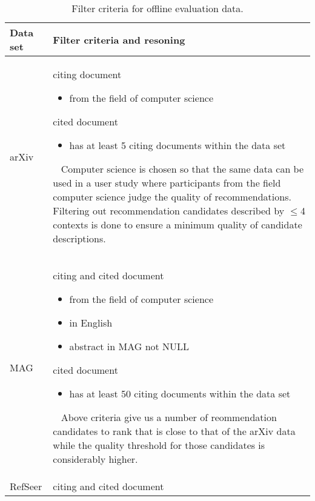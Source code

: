 
\begin{table}[]
\centering
    \caption{Filter criteria for offline evaluation data.}
    \label{tab:datasetfilter}
\begin{center}
    \begin{tabular}{lp{11.5cm}}
    \toprule
    Data set & Filter criteria and resoning\\
    \midrule
    arXiv & citing document
            \begin{itemize}
                \item from the field of computer science
            \end{itemize}
            cited document
            \begin{itemize}
                \item has at least 5 citing documents within the data set
            \end{itemize}
            \ 
            \newline
            Computer science is chosen so that the same data can be used in a user study where participants from the field computer science judge the quality of recommendations.
            \newline
            Filtering out recommendation candidates described by $\le$4 contexts is done to ensure a minimum quality of candidate descriptions.\\
    \midrule
    MAG & citing and cited document
            \begin{itemize}
                \item from the field of computer science
                \item in English
                \item abstract in MAG not NULL
            \end{itemize}
            cited document
            \begin{itemize}
                \item has at least 50 citing documents within the data set
            \end{itemize}
            \ 
            \newline
            Above criteria give us a number of reommendation candidates to rank that is close to that of the arXiv data while the quality threshold for those candidates is considerably higher.\\
    \midrule
    RefSeer & citing and cited document

\end{tabular}
\end{center}
\end{table}
